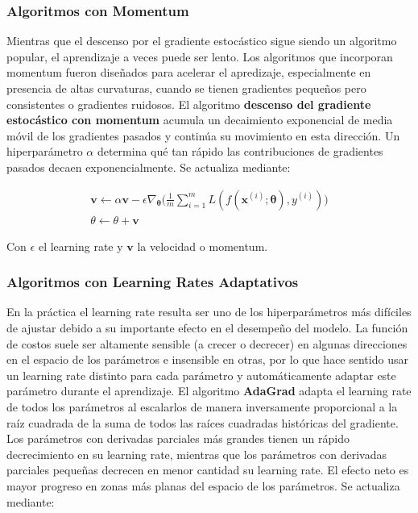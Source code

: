 \subsubsection{Algoritmos con Momentum}

Mientras que el descenso por el gradiente estoc\'astico sigue siendo un algoritmo popular, el aprendizaje a veces puede ser lento. Los algoritmos que incorporan momentum fueron dise{\~{n}}ados para acelerar el apredizaje, especialmente en presencia de altas curvaturas, cuando se tienen gradientes peque{\~{n}}os pero consistentes o gradientes ruidosos. El algoritmo \textbf{descenso del gradiente estoc\'astico con momentum} acumula un decaimiento exponencial de media m\'ovil de los gradientes pasados y contin\'ua su movimiento en esta direcci\'on. Un hiperpar\'ametro $\alpha$ determina qu\'e tan r\'apido las contribuciones de gradientes pasados decaen exponencialmente. Se actualiza mediante:

\begin{gather*}
\bm{v} \longleftarrow \alpha\bm{v} - \epsilon\nabla_{\bm{\theta}}\Big(\frac{1}{m}\sum_{i=1}^{m}L(f(\bm{x}^{(i)};\bm{\theta}),y^{(i)})\Big)
\\
\theta \longleftarrow \theta + \bm{v}
\end{gather*}

Con $\epsilon$ el learning rate y $\bm{v}$ la velocidad o momentum.

\subsubsection{Algoritmos con Learning Rates Adaptativos}

En la pr\'actica el learning rate resulta ser uno de los hiperpar\'ametros m\'as dif\'iciles de ajustar debido a su importante efecto en el desempe{\~{n}}o del modelo. La funci\'on de costos suele ser altamente sensible (a crecer o decrecer) en algunas direcciones en el espacio de los par\'ametros e insensible en otras, por lo que hace sentido usar un learning rate distinto para cada par\'ametro y autom\'aticamente adaptar este par\'ametro durante el aprendizaje. El algoritmo \textbf{AdaGrad} adapta el learning rate de todos los par\'ametros al escalarlos de manera inversamente proporcional a la ra\'iz cuadrada de la suma de todos las ra\'ices cuadradas hist\'oricas del gradiente. Los par\'ametros con derivadas parciales m\'as grandes tienen un r\'apido decrecimiento en su learning rate, mientras que los par\'ametros con derivadas parciales peque{\~{n}}as decrecen en menor cantidad su learning rate. El efecto neto es mayor progreso en zonas m\'as planas del espacio de los par\'ametros. Se actualiza mediante:

